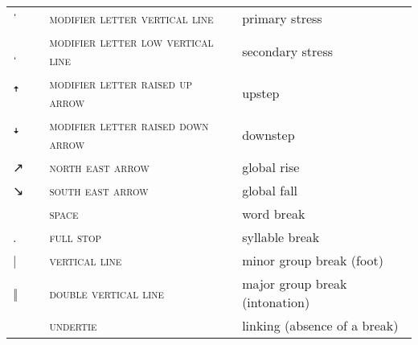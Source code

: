 \label{tab:ipa_boundaries}
 \tablelasttail{\bottomrule}

\begin{center}
\begin{xtabular}{ l L{1.2cm} L{5.4cm} L{4cm} }
{\large ˈ} &  & \textsc{modifier letter vertical line} & primary stress \\
{\large ˌ} &  & \textsc{modifier letter low vertical line} & secondary stress \\
{\large{}ꜛ} &  & \textsc{modifier letter raised up arrow} & upstep \\
{\large{}ꜜ} &  & \textsc{modifier letter raised down arrow} & downstep \\
{↗} &  & \textsc{north east arrow} & global rise \\
{↘} &  & \textsc{south east arrow} & global fall \\
 &  & \textsc{space} & word break \\
{\large.} &  & \textsc{full stop} & syllable break \\
{|} &  & \textsc{vertical line} & minor group break (foot) \\
{‖} &  & \textsc{double vertical line} & major group break (intonation) \\
 &  & \textsc{undertie} & linking (absence of a break) \\
\end{xtabular}
\end{center}